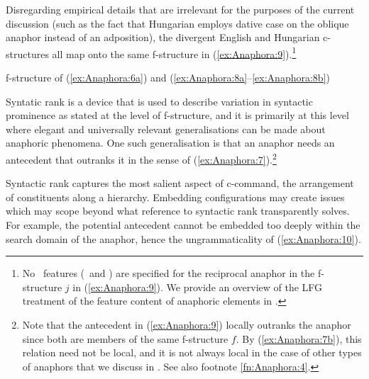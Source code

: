 \documentclass[output=paper,hidelinks]{langscibook}
\begin{document}
\noindent Disregarding empirical details that are irrelevant for the purposes of the current discussion (such as the fact that Hungarian employs dative case on the oblique anaphor instead of an adposition), the divergent English and Hungarian c-structures all map onto the same f-structure in (\ref{ex:Anaphora:9}).\footnote{No \NINDEX\ features (\PERS\ and \NUM) are specified for the reciprocal anaphor in the f-structure $j$ in (\ref{ex:Anaphora:9}). We provide an overview of the LFG treatment of the feature content of anaphoric elements in .}

\ea\label{ex:Anaphora:9} f-structure of (\ref{ex:Anaphora:6a}) and (\ref{ex:Anaphora:8a}--\ref{ex:Anaphora:8b})\\[1ex]
{}
\z
   
\noindent Syntatic rank is a device that is used to describe variation in syntactic prominence as stated at the level of f-structure, and it is primarily at this level where elegant and universally relevant generalisations can be made about anaphoric phenomena. One such generalisation is that an anaphor needs an antecedent that outranks it in the sense of (\ref{ex:Anaphora:7}).\footnote{Note that the antecedent in (\ref{ex:Anaphora:9}) locally outranks the anaphor since both are members of the same f-structure $f$. By (\ref{ex:Anaphora:7b}), this relation need not be local, and it is not always local in the case of other types of anaphors that we discuss in . See also footnote \ref{fn:Anaphora:4}.}

Syntactic rank captures the most salient aspect of c-command, the arrangement of constituents along a hierarchy. Embedding configurations may create issues which may scope beyond what reference to syntactic rank transparently solves. For example, the potential antecedent cannot be embedded too deeply within the search domain of the anaphor, hence the ungrammaticality of (\ref{ex:Anaphora:10}).
\end{document}
